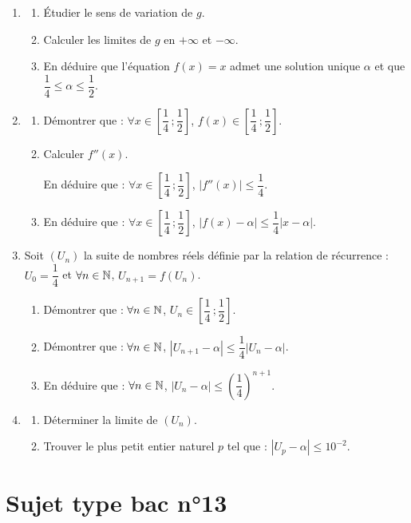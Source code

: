 \begin{enumerate}
	\item
	\begin{enumerate}
		\item Étudier le sens de variation de $g$.
		\item Calculer les limites de $g$ en $+\infty$ et $-\infty$.
		\item En déduire que l'équation $f(x)=x$ admet une solution unique $\alpha$ et que $\dfrac14\leqslant\alpha\leqslant\dfrac12$.
	\end{enumerate}
	\item
	\begin{enumerate}
		\item Démontrer que : $\forall x\in\left[\dfrac14\,;\dfrac12\right]$, $f(x)\in\left[\dfrac14\,;\dfrac12\right]$.
		\item Calculer $f''(x)$.

		En déduire que : $\forall x\in\left[\dfrac14\,;\dfrac12\right]$, $|f''(x)|\leqslant\dfrac14$.
		\item En déduire que : $\forall x\in\left[\dfrac14\,;\dfrac12\right]$, $|f(x)-\alpha|\leqslant\dfrac14|x-\alpha|$.
	\end{enumerate}
	\item Soit $(U_n)$ la suite de nombres réels définie par la relation de récurrence : $U_0=\dfrac14$ et $\forall n\in\mathbb{N}$, $U_{n+1}=f(U_n)$.
	\begin{enumerate}
		\item Démontrer que : $\forall n\in\mathbb{N}$, $U_n\in\left[\dfrac14\,;\dfrac12\right]$.
		\item Démontrer que : $\forall n\in\mathbb{N}$, $|U_{n+1}-\alpha|\leqslant\dfrac14|U_n-\alpha|$.
		\item En déduire que : $\forall n\in\mathbb{N}$, $|U_n-\alpha|\leqslant\left(\dfrac14\right)^{n+1}$.
	\end{enumerate}
	\item
	\begin{enumerate}
		\item Déterminer la limite de $(U_n)$.
		\item Trouver le plus petit entier naturel $p$ tel que : $|U_p-\alpha|\leqslant10^{-2}$.
	\end{enumerate}
\end{enumerate}


\section*{Sujet type bac n°13}

